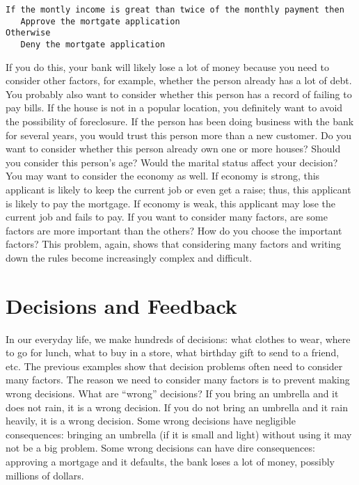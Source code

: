 \begin{verbatim}
If the montly income is great than twice of the monthly payment then
   Approve the mortgate application
Otherwise
   Deny the mortgate application
\end{verbatim}

If you do this, your bank will likely lose a lot of money because you
need to consider other factors, for example, whether the person
already has a lot of debt. You probably also want to consider whether
this person has a record of failing to pay bills.  If the house is not
in a popular location, you definitely want to avoid the possibility of
foreclosure. If the person has been doing business with the bank for
several years, you would trust this person more than a new customer.
Do you want to consider whether this person already own one or more
houses?  Should you consider this person's age?  Would the marital
status affect your decision?  You may want to consider the economy as
well. If economy is strong, this applicant is likely to keep the
current job or even get a raise; thus, this applicant is likely to pay
the mortgage. If economy is weak, this applicant may lose the current
job and fails to pay.  If you want to consider many factors, are some
factors are more important than the others? How do you choose the
important factors?  This problem, again, shows that considering many
factors and writing down the rules become increasingly complex and
difficult.

\section{Decisions and Feedback}

In our everyday life, we make hundreds of decisions: what clothes to
wear, where to go for lunch, what to buy in a store, what birthday
gift to send to a friend, etc.  The previous examples show that
decision problems often need to consider many factors.  The reason we
need to consider many factors is to prevent making wrong decisions.
What are ``wrong'' decisions? If you bring an umbrella and it does not
rain, it is a wrong decision.  If you do not bring an umbrella and it
rain heavily, it is a wrong decision.  Some wrong decisions have
negligible consequences: bringing an umbrella (if it is small and
light) without using it may not be a big problem.  Some wrong
decisions can have dire consequences: approving a mortgage and it
defaults, the bank loses a lot of money, possibly 
millions of dollars.

